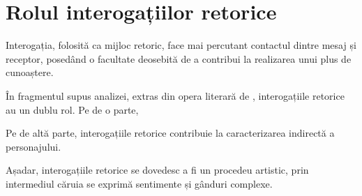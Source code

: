 \section{Rolul interogațiilor retorice}

Interogația, folosită ca mijloc retoric, face mai percutant contactul dintre mesaj și receptor, posedând o facultate deosebită de a contribui la realizarea unui plus de cunoaștere.

În fragmentul supus analizei, extras din opera literară  de , interogațiile retorice au un dublu rol. Pe de o parte,  

Pe de altă parte, interogațiile retorice contribuie la caracterizarea indirectă a personajului.  

Așadar, interogațiile retorice se dovedesc a fi un procedeu artistic, prin intermediul căruia se exprimă sentimente și gânduri complexe.
